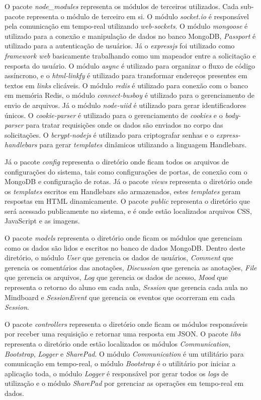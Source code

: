 O pacote \emph{node\_modules} representa os módulos de terceiros utilizados. Cada sub-pacote representa o módulo de terceiro em si. O módulo \emph{socket.io} é responsável pela comunicação em tempo-real utilizando \emph{web-sockets}. O módulo \emph{mongoose} é utilizado para a conexão e manipulação de dados no banco MongoDB, \emph{Passport} é utilizado para a autenticação de usuários. Já o \emph{expressjs} foi utilizado como \emph{framework web} basicamente trabalhando como um mapeador entre a solicitação e resposta do usuário. O módulo \emph{async} é utilizado para organizar o fluxo de código assíncrono, e o \emph{html-linkfy} é utilizado para transformar endereços presentes em textos em \emph{links} clicáveis. O módulo \emph{redis} é utilizado para conexão com o banco em memória Redis, o módulo \emph{connect-busboy} é utilizado para o gerenciamento de envio de arquivos. Já o módulo \emph{node-uiid} é utilizado para gerar identificadores únicos. O \emph{cookie-parser} é utilizado para o gerenciamento de \emph{cookies} e o \emph{body-parser} para tratar requisições onde os dados são enviados no corpo das solicitações. O \emph{bcrypt-nodejs} é utilizado para criptografar senhas e o \emph{express-handlebars} para gerar \emph{templates} dinâmicos utilizando a linguagem Handlebars. 


Já o pacote \emph{config} representa o diretório onde ficam todos os arquivos de configurações do sistema, tais como configurações de portas, de conexão com o MongoDB e configuração de rotas. Já o pacote \emph{views} representa o diretório onde os \emph{templates} escritos em Handlebars são armazenados, estes \emph{templates} geram respostas em HTML dinamicamente. O pacote \emph{public} representa o diretório que será acessado publicamente no sistema, e é onde estão localizados arquivos CSS, JavaScript e as imagens.

O pacote \emph{models} representa o diretório onde ficam os módulos que gerenciam como os dados são lidos e escritos no banco de dados MongoDB. Dentro deste diretório, o módulo \emph{User} que gerencia os dados de usuários, \emph{Comment} que gerencia os comentários das anotações, \emph{Discussion} que gerencia as anotações, \emph{File} que gerencia os arquivos, \emph{Log} que gerencia os dados de acesso, \emph{Mood} que representa o retorno do aluno em cada aula, \emph{Session} que gerencia cada aula no Mindboard e \emph{SessionEvent} que gerencia os eventos que ocorreram em cada \emph{Session}.

O pacote \emph{controllers} representa o diretório onde ficam os módulos responsáveis por receber uma requisição e retornar uma resposta em JSON. O pacote \emph{libs} representa o diretório onde estão localizados os módulos \emph{Communication}, \emph{Bootstrap}, \emph{Logger} e \emph{SharePad}. O módulo \emph{Communication} é um utilitário para comunicação em tempo-real, o módulo \emph{Bootstrap} é o utilitário por iniciar a aplicação toda, o módulo \emph{Logger} é responsável por gerar todos os \emph{logs} de utilização e o módulo \emph{SharePad} por gerenciar as operações em tempo-real em dados.

